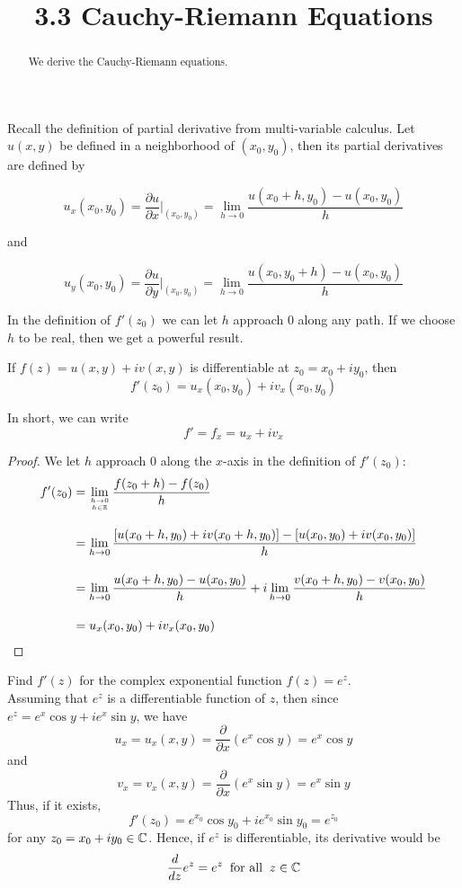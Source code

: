 \documentclass[handout]{ximera}
\title{3.3 Cauchy-Riemann Equations}
\begin{document}
\begin{abstract}
We derive the Cauchy-Riemann equations.
\end{abstract}

\maketitle

Recall the definition of partial derivative from multi-variable calculus.  
Let $u(x,y)$ be defined in a neighborhood of $(x_0,y_0)$, then its partial derivatives are defined by

\[
u_x(x_0, y_0) = \frac{\partial u}{\partial x}\Bigg|_{(x_0,y_0)} = \lim_{h \to 0} \frac{u(x_0 +h, y_0) - u(x_0,y_0)}{h}
\]

and

\[
u_y(x_0, y_0) = \frac{\partial u}{\partial y}\Bigg|_{(x_0,y_0)} = \lim_{h \to 0} \frac{u(x_0 , y_0+h) - u(x_0,y_0)}{h}
\]

In the definition of $f'(z_0)$ we can let $h$ approach $0$ along any path. If we choose $h$ to be real, then we get a powerful result.

\begin{theorem}
If $f(z) = u(x,y) + iv(x,y)$ is differentiable at $z_0 = x_0 + iy_0$, then
\[
f'(z_0) = u_x(x_0,y_0) + iv_x(x_0,y_0)
\]
\end{theorem}

\begin{remark}
In short, we can write
\[
f' = f_x = u_x + iv_x
\]
\end{remark}

\begin{proof}
We let $h$ approach $0$ along the $x$-axis in the definition of $f'(z_0)$:
\begin{align*}
f'(z_0) &= \lim_{h \to 0 \atop h \in \mathbb R} \frac{f(z_0 + h) -f(z_0)}{h} \\[10pt]
        &= \lim_{h \to 0} \frac{\left[u(x_0 +h, y_0) + iv(x_0 +h, y_0)\right] - \left[u(x_0,y_0)+iv(x_0, y_0)\right]}{h} \\[10pt]
        &=  \lim_{h \to 0} \frac{u(x_0 +h, y_0)- u(x_0,y_0)}{h} +i\lim_{h \to 0}\frac{v(x_0 +h, y_0)-v(x_0, y_0)}{h} \\[10pt]
        &= u_x(x_0,y_0) + iv_x(x_0,y_0)
\end{align*}
\end{proof}


\begin{example}[example 1]
Find $f'(z)$ for the complex exponential function $f(z) = e^z$.\\
Assuming that $e^z$ is a differentiable function of $z$, then since $e^z = e^x \cos y + i e^x \sin y$, we have
\[
u_x = u_x(x,y) = \frac{\partial}{\partial x} \left(e^x \cos y \right)= e^x \cos y 
\]
and
\[
 v_x = v_x(x,y) = \frac{\partial}{\partial x}\left(e^x \sin y\right) = e^x \sin y
\]
Thus, if it exists, 
\[
f'(z_0) = e^{x_0} \cos y_0 + i e^{x_0} \sin y_0  = e^{z_0}
\]
for any $z_0 = x_0 + iy_0 \in \mathbb C$.
Hence, if $e^z$ is differentiable, its derivative would be
\[
\frac{d}{dz} e^z = e^z \;\; \mbox{for all} \;\; z \in \mathbb C
\]
\end{example}
\end{document}
